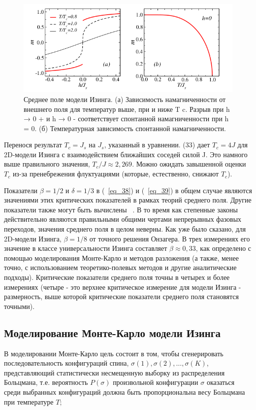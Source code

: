 \documentclass[11pt]{article}
\begin{document}
\begin{figure}[htp]
\centering
\includegraphics[scale=0.5]{fig10}
\caption{Среднее поле модели Изинга. (а) Зависимость намагниченности от внешнего поля для температур выше, при и ниже T c. Разрыв при h → 0 + и h → 0 - соответствует спонтанной намагниченности при h = 0. (б) Температурная зависимость спонтанной намагниченности.}
\label{}
\end{figure}

Перенося результат $T_c = J_s$ на $J_s$, указанный в уравнении. (33) дает $T_c = 4J$ для 2D-модели Изинга с взаимодействием ближайших соседей силой J. Это намного выше правильного значения, $T_c/J \approx 2,269$. Можно ожидать завышенной оценки $T_c$ из-за пренебрежения флуктуациями (которые, естественно, снижают $T_c$).

Показатели $\beta = 1/2$ и $\delta = 1/3$ в (~\ref{eq_38}) и (~\ref{eq_39}) в общем случае являются значениями этих критических показателей в рамках теорий среднего поля. Другие показатели также могут быть вычислены ~\cite{cardy}. В то время как степенные законы действительно являются правильными общими чертами непрерывных фазовых переходов, значения среднего поля в целом неверны. Как уже было сказано, для 2D-модели Изинга, $\beta = 1/8$ от точного решения Онзагера. В трех измерениях его значение в классе универсальности Изинга составляет $\beta \approx 0,33$, как определено с помощью моделирования Монте-Карло и методов разложения (а также, менее точно, с использованием теоретико-полевых методов и другие аналитические подходы). Критические показатели среднего поля точны в четырех и более измерениях (четыре - это верхнее критическое измерение для модели Изинга - размерность, выше которой критические показатели среднего поля становятся точными).

\subsection{Моделирование Монте-Карло модели Изинга}
В моделировании Монте-Карло цель состоит в том, чтобы сгенерировать последовательность конфигураций спина, $\sigma (1), \sigma (2), \dots , \sigma (K) $,  представляющий статистически несмещенную выборку из распределения Больцмана, т.е. вероятность $P(\sigma )$ произвольной конфигурации $\sigma $ оказаться среди выбранных конфигураций должна быть пропорциональна весу Больцмана при температуре $T$;
\end{document}
